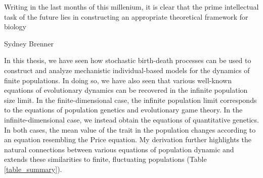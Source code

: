 \epigraph{\justifying Writing in the last months of this millenium, it is clear that the prime intellectual task of the future lies in constructing an appropriate theoretical framework for biology}{Sydney Brenner~\citep{brenner_theoretical_1999}}

\justifying
In this thesis, we have seen how stochastic birth-death processes can be used to construct and analyze mechanistic individual-based models for the dynamics of finite populations. In doing so, we have also seen that various well-known equations of evolutionary dynamics can be recovered in the infinite population size limit. In the finite-dimensional case, the infinite population limit corresponds to the equations of population genetics and evolutionary game theory. In the infinite-dimensional case, we instead obtain the equations of quantitative genetics. In both cases, the mean value of the trait in the population changes according to an equation resembling the Price equation. My derivation further highlights the natural connections between various equations of population dynamic and extends these similarities to finite, fluctuating populations (Table \ref{table_summary}).

